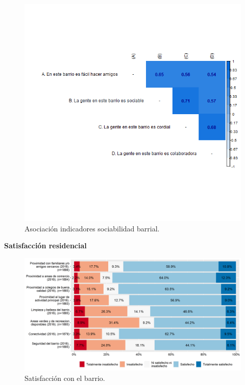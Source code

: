 \documentclass[
  12pt,
]{book}
\begin{document}
\begin{figure}[H]

{\centering \includegraphics[width=1\linewidth,height=1\textheight]{output/graphs/sociabilidad-barrial_cor} 

}

\caption{Asociación indicadores sociabilidad barrial.}\label{fig:unnamed-chunk-7}
\end{figure}

\textbf{Satisfacción residencial}

\begin{figure}[H]

{\centering \includegraphics[width=1\linewidth,height=1\textheight]{output/graphs/satisfaccion-residencial} 

}

\caption{Satisfacción con el barrio.}\label{fig:unnamed-chunk-8}
\end{figure}
\end{document}
